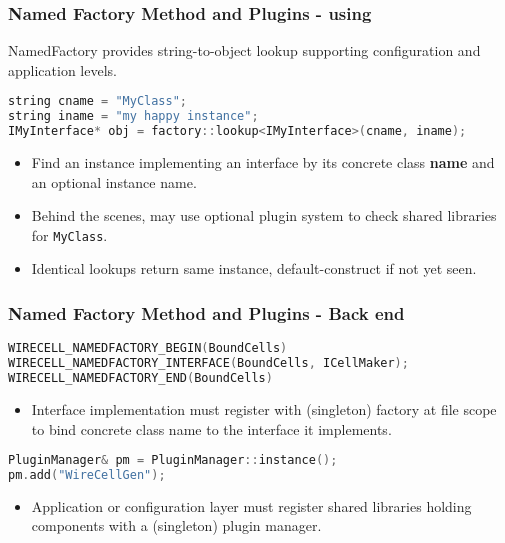 \documentclass[xcolor=dvipsnames]{beamer}
\begin{document}
\begin{frame}[fragile]
  \frametitle{Named Factory Method and Plugins - using}

  NamedFactory provides string-to-object lookup supporting
  configuration and application levels.

  \begin{lstlisting}[language=C++]
string cname = "MyClass";
string iname = "my happy instance";
IMyInterface* obj = factory::lookup<IMyInterface>(cname, iname);
  \end{lstlisting}
  \begin{itemize}
  \item Find an instance implementing an interface by its concrete class \textbf{name} and an optional instance name.
  \item Behind the scenes, may use optional plugin system to check shared libraries for \texttt{MyClass}.
  \item Identical lookups return same instance, default-construct if not yet seen.
  \end{itemize}
\end{frame}

\begin{frame}[fragile]
  \frametitle{Named Factory Method and Plugins - Back end}
  \begin{lstlisting}[language=C++]
WIRECELL_NAMEDFACTORY_BEGIN(BoundCells)
WIRECELL_NAMEDFACTORY_INTERFACE(BoundCells, ICellMaker);
WIRECELL_NAMEDFACTORY_END(BoundCells)
  \end{lstlisting}

  \begin{itemize}
  \item Interface implementation must register with (singleton)
    factory at file scope to bind concrete class name to the interface
    it implements.
  \end{itemize}

  \vfill

  \begin{lstlisting}[language=C++]
PluginManager& pm = PluginManager::instance();
pm.add("WireCellGen");
  \end{lstlisting}

  \begin{itemize}
  \item Application or configuration layer must register shared
    libraries holding components with a (singleton) plugin manager.
  \end{itemize}
\end{frame}
\end{document}
